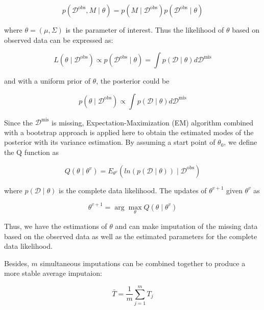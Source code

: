 \documentclass[12pt]{article}
\begin{document}
\begin{equation}
p\left(\mathcal{D}^{\mathrm{obs}}, M \mid \theta\right)=p\left(M \mid \mathcal{D}^{\mathrm{obs}}\right) p\left(\mathcal{D}^{\mathrm{obs}} \mid \theta\right)
\end{equation}


where $\theta=(\mu, \Sigma)$ is the parameter of interest. Thus the likelihood of $\theta$ based on observed data can be expressed as:

\begin{equation}
L\left(\theta \mid \mathcal{D}^{\mathrm{obs}}\right) \propto p\left(\mathcal{D}^{\mathrm{obs}} \mid \theta\right)
=\int p(\mathcal{D} \mid \theta) d \mathcal{D}^{\mathrm{mis}}
\end{equation}


and with a uniform prior of $\theta$, the posterior could be

\begin{equation}
    p\left(\theta  \mid  \mathcal{D}^{\mathrm{obs}} \right)
\propto \int p(\mathcal{D} \mid \theta) d \mathcal{D}^{\mathrm{mis}}
\end{equation}


Since the $\mathcal{D}^{\mathrm{mis}}$ is missing, Expectation-Maximization (EM) algorithm combined with a bootstrap approach is applied here to obtain the estimated modes of the posterior with its variance estimation. By assuming a start point of $\theta_0$, we define the Q function as

\begin{equation}
  Q(\theta \mid \theta^{v}) = E_{\theta^{v}}(ln(p\left(  \mathcal{D} \mid \theta \right)) \mid  \mathcal{D}^{\mathrm{obs}})
\end{equation}


where $p\left(  \mathcal{D} \mid \theta \right)$ is the complete data likelihood. The updates of $\theta^{v+1}$ given $\theta^{v}$ as 

\begin{equation}
 \theta^{v+1} = \arg \max_{\theta} Q(\theta \mid \theta^{v})
\end{equation}

Thus, we have the estimations of $\theta$ and can make imputation of the missing data based on the observed data as well as the estimated parameters for the complete data likelihood.

Besides, $m$ simultaneous imputations can be combined together to produce a more stable average imputaion:

\begin{equation}
\bar{T}=\frac{1}{m} \sum_{j=1}^{m} T_{j}
\end{equation}
\end{document}
